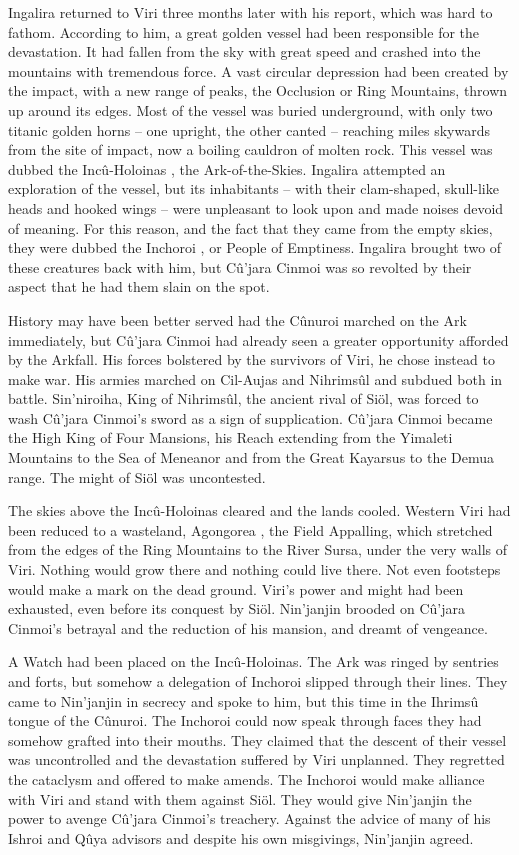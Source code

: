 \documentclass[]{book}
\begin{document}
Ingalira returned to Viri three months later with his report, which was hard to fathom.
According to him, a great golden vessel had been responsible for the devastation. It had
fallen from the sky with great speed and crashed into the mountains with tremendous
force. A vast circular depression had been created by the impact, with a new range of
peaks, the Occlusion or Ring Mountains, thrown up around its edges. Most of the
vessel was buried underground, with only two titanic golden horns -- one upright, the other canted -- reaching miles skywards from the site of impact, now a boiling cauldron
of molten rock. This vessel was dubbed the Incû-Holoinas , the Ark-of-the-Skies. Ingalira
attempted an exploration of the vessel, but its inhabitants -- with their clam-shaped,
skull-like heads and hooked wings -- were unpleasant to look upon and made noises
devoid of meaning. For this reason, and the fact that they came from the empty skies,
they were dubbed the Inchoroi , or People of Emptiness. Ingalira brought two of these
creatures back with him, but Cû'jara Cinmoi was so revolted by their aspect that he had
them slain on the spot.

History may have been better served had the Cûnuroi marched on the Ark
immediately, but Cû'jara Cinmoi had already seen a greater opportunity afforded by
the Arkfall. His forces bolstered by the survivors of Viri, he chose instead to make war.
His armies marched on Cil-Aujas and Nihrimsûl and subdued both in battle.
Sin'niroiha, King of Nihrimsûl, the ancient rival of Siöl, was forced to wash Cû'jara
Cinmoi's sword as a sign of supplication. Cû'jara Cinmoi became the High King of
Four Mansions, his Reach extending from the Yimaleti Mountains to the Sea of
Meneanor and from the Great Kayarsus to the Demua range. The might of Siöl was
uncontested.

The skies above the Incû-Holoinas cleared and the lands cooled. Western Viri had been
reduced to a wasteland, Agongorea , the Field Appalling, which stretched from the edges
of the Ring Mountains to the River Sursa, under the very walls of Viri. Nothing would
grow there and nothing could live there. Not even footsteps would make a mark on the
dead ground. Viri's power and might had been exhausted, even before its conquest by
Siöl. Nin'janjin brooded on Cû'jara Cinmoi's betrayal and the reduction of his
mansion, and dreamt of vengeance.

A Watch had been placed on the Incû-Holoinas. The Ark was ringed by sentries and
forts, but somehow a delegation of Inchoroi slipped through their lines. They came to
Nin'janjin in secrecy and spoke to him, but this time in the Ihrimsû tongue of the
Cûnuroi. The Inchoroi could now speak through faces they had somehow grafted into
their mouths. They claimed that the descent of their vessel was uncontrolled and the devastation suffered by Viri unplanned. They regretted the cataclysm and offered to
make amends. The Inchoroi would make alliance with Viri and stand with them
against Siöl. They would give Nin'janjin the power to avenge Cû'jara Cinmoi's
treachery. Against the advice of many of his Ishroi and Qûya advisors and despite his
own misgivings, Nin'janjin agreed.
\end{document}
